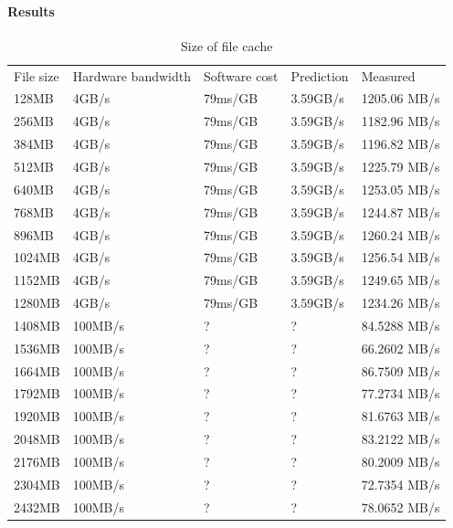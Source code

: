 \paragraph{Results}
\begin{table}[h]
\begin{center}
\begin{tabular}{| l | l | l | l | l |}
\hline
File size & Hardware bandwidth & Software cost & Prediction & Measured \\
128MB  & 4GB/s   & 79ms/GB & 3.59GB/s & 1205.06 MB/s \\ \hline
256MB  & 4GB/s   & 79ms/GB & 3.59GB/s & 1182.96 MB/s \\ \hline
384MB  & 4GB/s   & 79ms/GB & 3.59GB/s & 1196.82 MB/s \\ \hline
512MB  & 4GB/s   & 79ms/GB & 3.59GB/s & 1225.79 MB/s \\ \hline
640MB  & 4GB/s   & 79ms/GB & 3.59GB/s & 1253.05 MB/s \\ \hline
768MB  & 4GB/s   & 79ms/GB & 3.59GB/s & 1244.87 MB/s \\ \hline
896MB  & 4GB/s   & 79ms/GB & 3.59GB/s & 1260.24 MB/s \\ \hline
1024MB & 4GB/s   & 79ms/GB & 3.59GB/s & 1256.54 MB/s \\ \hline
1152MB & 4GB/s   & 79ms/GB & 3.59GB/s & 1249.65 MB/s \\ \hline
1280MB & 4GB/s   & 79ms/GB & 3.59GB/s & 1234.26 MB/s \\ \hline
1408MB & 100MB/s & ?       & ?        & 84.5288 MB/s \\ \hline
1536MB & 100MB/s & ?       & ?        & 66.2602 MB/s \\ \hline
1664MB & 100MB/s & ?       & ?        & 86.7509 MB/s \\ \hline
1792MB & 100MB/s & ?       & ?        & 77.2734 MB/s \\ \hline
1920MB & 100MB/s & ?       & ?        & 81.6763 MB/s \\ \hline
2048MB & 100MB/s & ?       & ?        & 83.2122 MB/s \\ \hline
2176MB & 100MB/s & ?       & ?        & 80.2009 MB/s \\ \hline
2304MB & 100MB/s & ?       & ?        & 72.7354 MB/s \\ \hline
2432MB & 100MB/s & ?       & ?        & 78.0652 MB/s \\ \hline
\end{tabular}
\end{center}
\caption{Size of file cache\label{tab:file-cache}}
\end{table}

